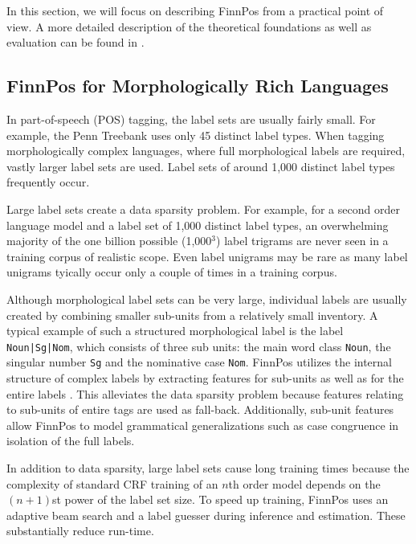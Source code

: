 \documentclass{llncs}
\begin{document}
In this section, we will focus on describing FinnPos from a
practical point of view. A more detailed description of the theoretical foundations 
as well as evaluation can be found in
\cite{silfverberg/2015}.

\subsection{FinnPos for Morphologically Rich Languages}

In part-of-speech (POS) tagging, the label sets are usually fairly small. For example,
the Penn Treebank uses only 45 distinct label types. When tagging
morphologically complex languages, where full morphological labels are
required, vastly larger label sets are used. Label sets of around 1,000
distinct label types frequently occur. 

Large label sets create a data sparsity problem. For example, for a
second order language model and a label set of 1,000 distinct label types, an
overwhelming majority of the one billion possible (1,000$^3$) label
trigrams are never seen in a training corpus of realistic scope. Even
label unigrams may be rare as many label unigrams tyically occur only a couple 
of times in a training corpus.

Although morphological label sets can be very large, individual labels
are usually created by combining smaller sub-units from a relatively
small inventory. A typical example of such a structured morphological
label is the label {\tt Noun|Sg|Nom}, which consists of three sub
units: the main word class {\tt Noun}, the singular number {\tt Sg}
and the nominative case {\tt Nom}. FinnPos utilizes the internal
structure of complex labels by extracting features for sub-units as
well as for the entire labels \cite{silfverberg/2014}. This alleviates
the data sparsity problem because features relating to sub-units of
entire tags are used as fall-back. Additionally, sub-unit features
allow FinnPos to model grammatical generalizations such as case
congruence in isolation of the full labels.

In addition to data sparsity, large label sets cause long training
times because the complexity of standard CRF training of an $n$th
order model depends on the $(n+1)$st power of the label set size. To
speed up training, FinnPos uses an adaptive beam search and a label
guesser \cite{silfverberg/2015} during inference and estimation. These
substantially reduce run-time.

\end{document}
